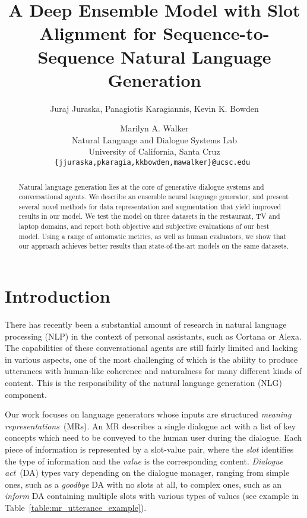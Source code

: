 \documentclass[11pt,a4paper]{article}
\title{A Deep Ensemble Model with Slot Alignment for Sequence-to-Sequence Natural Language Generation}
\author{Juraj Juraska, Panagiotis Karagiannis, Kevin K. Bowden \and Marilyn A. Walker \\
Natural Language and Dialogue Systems Lab \\
University of California, Santa Cruz \\
{\tt \{jjuraska,pkaragia,kkbowden,mawalker\}@ucsc.edu }}
\date{}
\begin{document}
\maketitle

\begin{abstract}

Natural language generation lies at the core of generative dialogue systems and conversational agents. We describe an ensemble neural language generator, and present several novel methods for data representation and augmentation that yield improved results in our model. We test the model on three datasets in the restaurant, TV and laptop domains, and report both objective and subjective evaluations of our best model. Using a range of automatic metrics, as well as human evaluators, we show that our approach achieves better results than state-of-the-art models on the same datasets.

\end{abstract}



\section{Introduction}
\label{sec:introduction}


There has recently been a substantial amount of research in natural language processing (NLP) in the context of  personal assistants, such as Cortana or Alexa. The capabilities of these conversational agents are still fairly limited and lacking in various aspects, one of the most challenging of which is the ability to produce utterances with human-like coherence and naturalness for many different kinds of content. This is the responsibility of the natural language generation (NLG) component.

Our work focuses on language generators whose inputs are  structured \emph{meaning representations}~(MRs). An MR describes a single dialogue act with a list of key concepts which need to be conveyed to the human user during the dialogue. Each piece of information is represented by a slot-value pair, where the \emph{slot} identifies the type of information and the \emph{value} is the corresponding content. \emph{Dialogue act}~(DA) types vary depending on the dialogue manager, ranging from simple ones, such as a \emph{goodbye} DA with no slots at all, to complex ones, such as an \emph{inform} DA containing multiple slots with various types of values (see example in Table~\ref{table:mr_utterance_example}).
\end{document}
